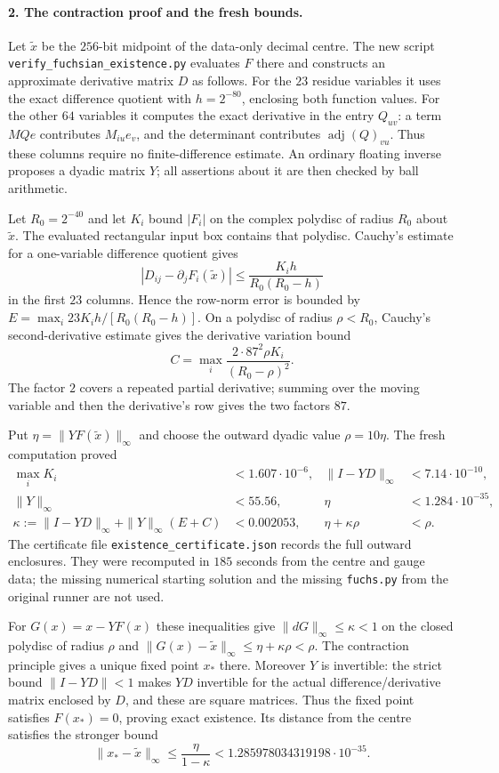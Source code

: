 \paragraph{2. The contraction proof and the fresh bounds.}
Let $\widetilde x$ be the $256$-bit midpoint of the data-only
decimal centre.  The new script
\texttt{verify\_fuchsian\_existence.py} evaluates $F$ there and
constructs an approximate derivative matrix $D$ as follows.
For the $23$ residue variables it uses the exact difference
quotient with $h=2^{-80}$, enclosing both function values.
For the other $64$ variables it computes the exact derivative
in the entry $Q_{uv}$: a term $MQe$ contributes $M_{iu}e_v$,
and the determinant contributes $\operatorname{adj}(Q)_{vu}$.
Thus these columns require no finite-difference estimate.
An ordinary floating inverse proposes a dyadic matrix $Y$;
all assertions about it are then checked by ball arithmetic.

Let $R_0=2^{-40}$ and let $K_i$ bound $|F_i|$ on the complex
polydisc of radius $R_0$ about $\widetilde x$.  The evaluated
rectangular input box contains that polydisc.  Cauchy's estimate
for a one-variable difference quotient gives
\[
 |D_{ij}-\partial_jF_i(\widetilde x)|
 \leq \frac{K_i h}{R_0(R_0-h)}
\]
in the first $23$ columns.  Hence the row-norm error is bounded by
$E=\max_i23K_i h/[R_0(R_0-h)]$.
On a polydisc of radius $\rho<R_0$, Cauchy's second-derivative
estimate gives the derivative variation bound
\[
 C=\max_i\frac{2\cdot87^2\rho K_i}{(R_0-\rho)^2}.
\]
The factor $2$ covers a repeated partial derivative; summing
over the moving variable and then the derivative's row gives
the two factors $87$.

Put $\eta=\|YF(\widetilde x)\|_\infty$ and choose the outward
dyadic value $\rho=10\eta$.  The fresh computation proved
\begin{align*}
 \max_iK_i&<1.607\cdot10^{-6},&
 \|I-YD\|_\infty&<7.14\cdot10^{-10},\\
 \|Y\|_\infty&<55.56,&
 \eta&<1.284\cdot10^{-35},\\
 \kappa:=\|I-YD\|_\infty+\|Y\|_\infty(E+C)
        &<0.002053,&
 \eta+\kappa\rho&<\rho.
\end{align*}
The certificate file \texttt{existence\_\allowbreak certificate.json}
records the full outward enclosures.
They were recomputed in $185$ seconds from the centre and gauge
data; the missing numerical starting solution and the missing
\texttt{fuchs.py} from the original runner are not used.

For $G(x)=x-YF(x)$ these inequalities give
$\|dG\|_\infty\leq\kappa<1$ on the closed polydisc of radius
$\rho$ and $\|G(x)-\widetilde x\|_\infty\leq\eta+\kappa\rho<\rho$.
The contraction principle gives a unique fixed point $x_*$ there.
Moreover $Y$ is invertible: the strict bound $\|I-YD\|<1$ makes
$YD$ invertible for the actual difference/derivative matrix
enclosed by $D$, and these are square matrices.  Thus the fixed
point satisfies $F(x_*)=0$, proving exact existence.
Its distance from the centre satisfies the stronger bound
\begin{equation}
 \|x_*-\widetilde x\|_\infty
 \leq\frac{\eta}{1-\kappa}
 <1.285978034319198\cdot10^{-35}.                 \tag{I17.3}
\end{equation}

